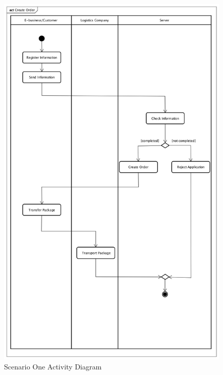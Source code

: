\documentclass[12pt]{scrreprt}
\begin{document}
\begin{figure}[H]
  \centering\includegraphics[width=6in]{DocumentRes/1ActivityDiagram.png}
  \caption{Scenario One Activity Diagram}
\end{figure}
\end{document}
